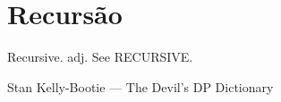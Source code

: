 \chapter{Recursão}\label{cap10}

\epigraph{Recursive. adj. See RECURSIVE.}{Stan Kelly-Bootie --- The
  Devil's DP Dictionary}